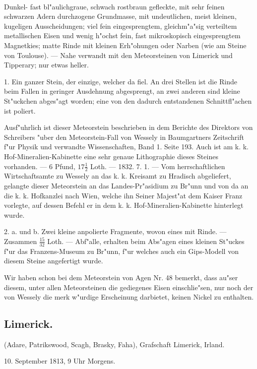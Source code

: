 \documentclass[a4paper, 11pt, oneside, polutonikogreek, german]{article}
\begin{document}
\paragraph{}
Dunkel- fast bl"aulichgraue, schwach rostbraun gefleckte, mit sehr feinen schwarzen Adern durchzogene Grundmasse, mit undeutlichen, meist kleinen, kugeligen Ausscheidungen; viel fein eingesprengtem, gleichm"a"sig verteiltem metallischen Eisen und wenig h"ochst fein, fast mikroskopisch eingesprengtem Magnetkies; matte Rinde mit kleinen Erh"ohungen oder Narben (wie am Steine von Toulouse). --- Nahe verwandt mit den Meteorsteinen von Limerick und Tipperary; nur etwas heller.

1. Ein ganzer Stein, der einzige, welcher da fiel. An drei Stellen ist die Rinde beim Fallen in geringer Ausdehnung abgesprengt, an zwei anderen sind kleine St"uckchen abges"agt worden; eine von den dadurch entstandenen Schnittfl"achen ist poliert.

Ausf"uhrlich ist dieser Meteorstein beschrieben in dem Berichte des Direktors von Schreibers "uber den Meteorstein-Fall von Wessely in Baumgartners Zeitschrift f"ur Physik und verwandte Wissenschaften, Band 1. Seite 193. Auch ist am k. k. Hof-Mineralien-Kabinette eine sehr genaue Lithographie dieses Steines vorhanden. --- 6 Pfund, $17\frac{1}{2}$ Loth. --- 1832. 7. 1. --- Vom herrschaftlichen Wirtschaftsamte zu Wessely an das k. k. Kreisamt zu Hradisch abgeliefert, gelangte dieser Meteorstein an das Landes-Pr"asidium zu Br"unn und von da an die k. k. Hofkanzlei nach Wien, welche ihn Seiner Majest"at dem Kaiser Franz vorlegte, auf dessen Befehl er in dem k. k. Hof-Mineralien-Kabinette hinterlegt wurde.

2. a. und b. Zwei kleine anpolierte Fragmente, wovon eines mit Rinde. --- Zusammen $\frac{15}{32}$ Loth. --- Abf"alle, erhalten beim Abs"agen eines kleinen St"uckes f"ur das Franzens-Museum zu Br"unn, f"ur welches auch ein Gips-Modell von diesem Steine angefertigt wurde.

\setlength{\leftskip}{10mm}
\setlength{\parindent}{0pt}

{\footnotesize Wir haben schon bei dem Meteorstein von Agen Nr. 48 bemerkt, dass au"ser diesem, unter allen Meteorsteinen die gediegenes Eisen einschlie"sen, nur noch der von Wessely die merk w"urdige Erscheinung darbietet, keinen Nickel zu enthalten.}

\setlength{\leftskip}{0pt}
\setlength{\parindent}{20pt}

\subsection{Limerick.}
\begin{center}
\small
(Adare, Patrikswood, Scagh, Brasky, Faha), Grafschaft Limerick, Irland.

10. September 1813, 9 Uhr Morgens.
\end{center}
\end{document}
